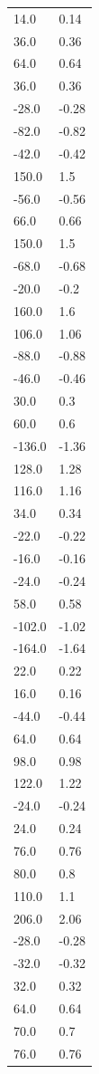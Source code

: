\begin{longtable}{ll}
14.0 & 0.14 \\
36.0 & 0.36 \\
64.0 & 0.64 \\
36.0 & 0.36 \\
-28.0 & -0.28 \\
-82.0 & -0.82 \\
-42.0 & -0.42 \\
150.0 & 1.5 \\
-56.0 & -0.56 \\
66.0 & 0.66 \\
150.0 & 1.5 \\
-68.0 & -0.68 \\
-20.0 & -0.2 \\
160.0 & 1.6 \\
106.0 & 1.06 \\
-88.0 & -0.88 \\
-46.0 & -0.46 \\
30.0 & 0.3 \\
60.0 & 0.6 \\
-136.0 & -1.36 \\
128.0 & 1.28 \\
116.0 & 1.16 \\
34.0 & 0.34 \\
-22.0 & -0.22 \\
-16.0 & -0.16 \\
-24.0 & -0.24 \\
58.0 & 0.58 \\
-102.0 & -1.02 \\
-164.0 & -1.64 \\
22.0 & 0.22 \\
16.0 & 0.16 \\
-44.0 & -0.44 \\
64.0 & 0.64 \\
98.0 & 0.98 \\
122.0 & 1.22 \\
-24.0 & -0.24 \\
24.0 & 0.24 \\
76.0 & 0.76 \\
80.0 & 0.8 \\
110.0 & 1.1 \\
206.0 & 2.06 \\
-28.0 & -0.28 \\
-32.0 & -0.32 \\
32.0 & 0.32 \\
64.0 & 0.64 \\
70.0 & 0.7 \\
76.0 & 0.76 \\

\end{longtable}
